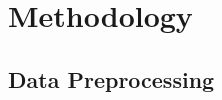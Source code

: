 \documentclass[10pt,a4paper]{article}
\begin{document}
%
\section{Methodology}
%
\subsection{Data Preprocessing}
%
%
%
\end{document}

